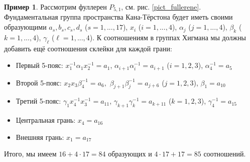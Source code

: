 \documentclass[14pt, dvipsnames, twoside]{extarticle}
\theoremstyle{definition}
\newtheorem{example}{Пример}
\theoremstyle{remark}
\begin{document}
\begin{example}

Рассмотрим фуллерен $P_{5, 1}$, см. рис. \ref{pict_fullerene}. Фундаментальная группа пространства Кана-Тёрстона будет иметь своими образующими $a_s, b_s, c_s, d_s$ ($s = 1, ..., 17$), $x_i$ ($i = 1, ..., 4$), $\alpha_j$ ($j = 1, ..., 4$), $\beta_k$ ($k = 1, ..., 4$), $\gamma_\ell$ ($\ell = 1, ..., 4$). К соотношениям в группах Хигмана мы должны добавить ещё соотношения склейки для каждой грани:


\begin{itemize}



 \item Первый 5-пояс: $x_1^{-1}\alpha_1x_2^{-1} = a_1$, $\alpha_{i + 1}\alpha_{i}^{-1} = a_{i + 1}$ ($i = 1, 2, 3$), $\alpha_4^{-1} = a_5$
 
 \item Второй 5-пояс: $x_2x_3\beta_4^{-1} = a_6,$ $\beta_{j + 1}\beta_{j}^{-1} = a_{j + 6}$ ($j = 1, 2, 3$), $\beta_1 = a_{10}$
 
 \item Третий 5-пояс: $\gamma_1x_4^{-1}x_3^{-1} = a_{11}$, $\gamma_{k + 1}\gamma_k^{-1} = a_{k + 11}$ ($k = 1, 2, 3$), $\gamma_4^{-1} = a_{15}$
 
 \item Центральная грань: $x_4 = a_{16}$
 \item Внешняя грань: $x_1 = a_{17}$
 \end{itemize}



Итого, мы имеем $16 + 4\cdot 17 = 84$ образующих и $4\cdot 17 + 17 = 85$ соотношений.

\end{example}
\end{document}

